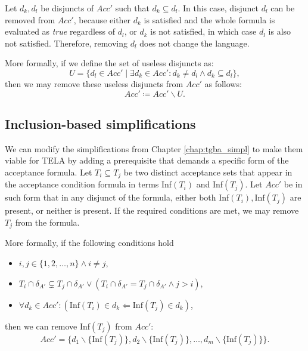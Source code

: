 \documentclass[
  digital, %
  twoside, %
  table,   %
  lof,     %
  lot,     %
]{fithesis3}
\begin{document}
Let $d_k, d_l$ be disjuncts of $Acc'$ such that $d_k \subseteq d_l$. In this case, disjunct $d_l$ can be removed from $Acc'$, because either $d_k$ is satisfied and the whole formula is evaluated as \emph{true} regardless of $d_l$, or $d_k$ is not satisfied, in which case $d_l$ is also not satisfied. Therefore, removing $d_l$ does not change the language.

More formally, if we define the set of useless disjuncts as:
\begin{equation*}
  U = \{d_l \in Acc' \mid \exists d_k \in Acc' \colon d_k \neq d_l \wedge d_k \subseteq d_l\},
\end{equation*}
then we may remove these useless disjuncts from $Acc'$ as follows:
\begin{equation*}
  Acc' \coloneqq Acc' \smallsetminus U.
\end{equation*}

\subsection{Inclusion-based simplifications}
We can modify the simplifications from Chapter \ref{chap:tgba_simpl} to make them viable for TELA by adding a prerequisite that demands a specific form of the acceptance formula. Let $T_i \subseteq T_j$ be two distinct acceptance sets that appear in the acceptance condition formula in terms Inf$(T_i)$ and Inf$(T_j)$. Let $Acc'$ be in such form that in any disjunct of the formula, either both Inf$(T_i), \text{Inf}(T_j)$ are present, or neither is present. If the required conditions are met, we may remove $T_j$ from the formula. 

More formally, if the following conditions hold
\begin{itemize}
  \item $i, j \in \{1, 2, \dots, n\} \wedge i \neq j$,
  \item $T_i \cap \delta_{A'} \subsetneq T_j \cap \delta_{A'} \vee (T_i \cap \delta_{A'} = T_j \cap \delta_{A'} \wedge j > i)$,
  \item $\forall d_k \in Acc' \colon (\text{Inf}(T_i) \in d_k \Leftarrow \text{Inf}(T_j) \in d_k)$,
\end{itemize}
then we can remove Inf$(T_j)$ from $Acc'$: 
\begin{equation*}
  Acc' = \{d_1 \smallsetminus \{\text{Inf}(T_j)\}, d_2 \smallsetminus \{\text{Inf}(T_j)\}, \dots, d_m \smallsetminus \{\text{Inf}(T_j)\}\}.
\end{equation*} 
\end{document}
